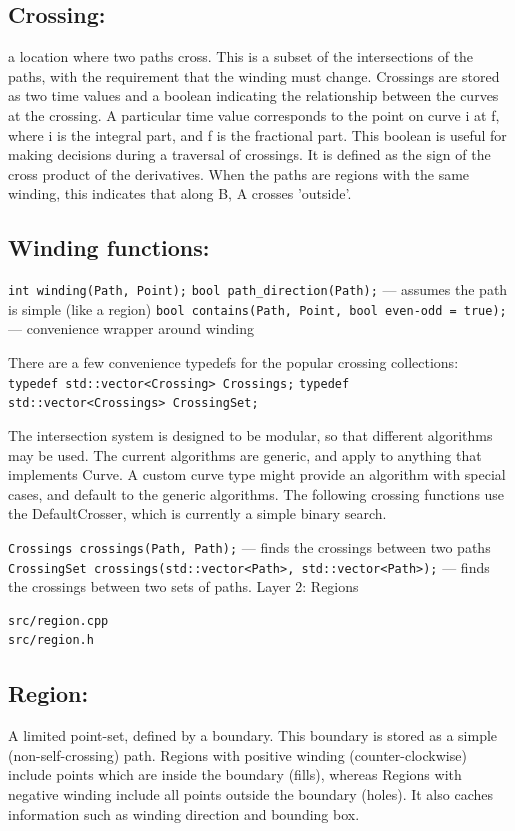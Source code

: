 \documentclass[openany]{book}
\begin{document}
\subsection{Crossing:}
 a location where two paths cross. This is a subset of the intersections of the paths, with the requirement that the winding must change. Crossings are stored as two time values and a boolean indicating the relationship between the curves at the crossing. A particular time value corresponds to the point on curve i at f, where i is the integral part, and f is the fractional part. This boolean is useful for making decisions during a traversal of crossings. It is defined as the sign of the cross product of the derivatives. When the paths are regions with the same winding, this indicates that along B, A crosses 'outside'.

\subsection{Winding functions:}

\verb|int winding(Path, Point);|
\verb|bool path_direction(Path);|  —  assumes the path is simple (like a region)
\verb|bool contains(Path, Point, bool even-odd = true);|  —  convenience wrapper around winding

There are a few convenience typedefs for the popular crossing collections:
\verb|typedef std::vector<Crossing> Crossings;|
\verb|typedef std::vector<Crossings> CrossingSet;|

The intersection system is designed to be modular, so that different algorithms may be used. The current algorithms are generic, and apply to anything that implements Curve. A custom curve type might provide an algorithm with special cases, and default to the generic algorithms. The following crossing functions use the DefaultCrosser, which is currently a simple binary search.

\verb|Crossings crossings(Path, Path);|  —  finds the crossings between two paths
\verb|CrossingSet crossings(std::vector<Path>, std::vector<Path>);|  —  finds the crossings between two sets of paths.
Layer 2: Regions

\begin{verbatim}
src/region.cpp
src/region.h
\end{verbatim}

\subsection{Region:}
A limited point-set, defined by a boundary. This boundary is stored as a simple (non-self-crossing) path. Regions with positive winding (counter-clockwise) include points which are inside the boundary (fills), whereas Regions with negative winding include all points outside the boundary (holes). It also caches information such as winding direction and bounding box.
\end{document}
